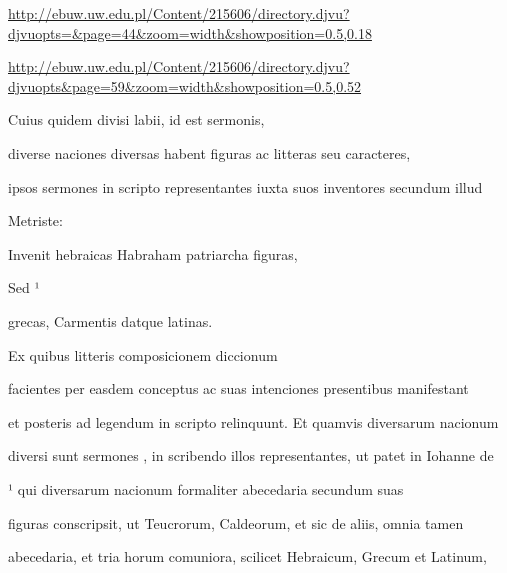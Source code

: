 
\newParkoszpage

{
\url{http://ebuw.uw.edu.pl/Content/215606/directory.djvu?djvuopts=&page=44&zoom=width&showposition=0.5,0.18}

\url{http://ebuw.uw.edu.pl/Content/215606/directory.djvu?djvuopts&page=59&zoom=width&showposition=0.5,0.52}
}
\fullpreviouslines


{
\color{blue}

Cuius quidem divisi labii, id est sermonis,

diverse naciones diversas habent figuras ac litteras seu caracteres,
}


\fulllines

ipsos sermones in scripto representantes iuxta suos inventores secundum illud

\splitlines{}

Metriste:

\indentKcyt Invenit hebraicas Habraham patriarcha figuras,


\indentKcyt Sed ¹

\splitlines{}

\indentKcyt \phantom{Sed Catius}grecas, Carmentis datque latinas.

\indentK Ex quibus litteris composicionem diccionum

\fulllines{}

facientes per easdem conceptus ac suas intenciones presentibus manifestant

et posteris ad legendum in scripto relinquunt. Et quamvis diversarum nacionum

diversi sunt sermones , in scribendo illos representantes, ut patet in Iohanne de


¹ qui diversarum nacionum formaliter abecedaria secundum suas

figuras conscripsit, ut Teucrorum, Caldeorum, et sic de aliis, omnia tamen

abecedaria, et tria horum comuniora, scilicet Hebraicum, Grecum et Latinum,

